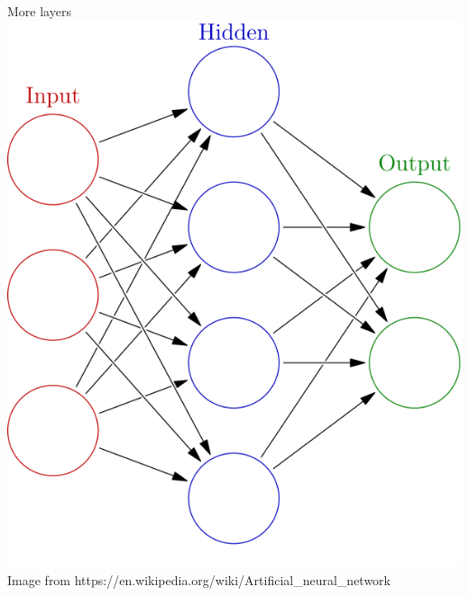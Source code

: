 \begin{frame}{More layers}
	\includegraphics[width=.5\textwidth, center]{figuras/Colored_neural_network_1_hidden.png}
	\tiny{Image from https://en.wikipedia.org/wiki/Artificial\_neural\_network }
\end{frame}